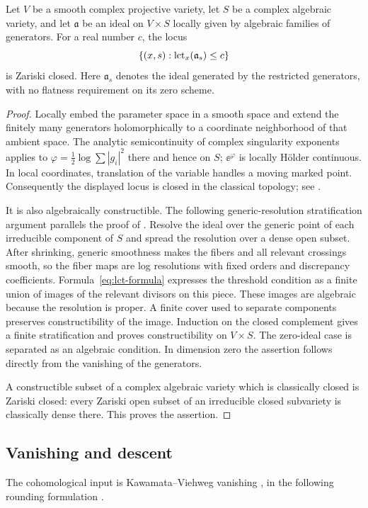 \begin{lemma}\label{lem:lct-family}
Let $V$ be a smooth complex projective variety, let $S$ be a complex algebraic variety, and let $\mathfrak{a}$ be an ideal on $V\times S$ locally given by algebraic families of generators. For a real number $c$, the locus
\[
 \{(x,s):\operatorname{lct}_x(\mathfrak{a}_s)\leq c\}
\]
is Zariski closed. Here $\mathfrak{a}_s$ denotes the ideal generated by the restricted generators, with no flatness requirement on its zero scheme.
\end{lemma}
\begin{proof}
Locally embed the parameter space in a smooth space and extend the finitely many generators holomorphically to a coordinate neighborhood of that ambient space. The analytic semicontinuity of complex singularity exponents applies to $\varphi=\tfrac12\log\sum |g_i|^2$ there and hence on $S$; $\ee^{\varphi}$ is locally H\"older continuous. In local coordinates, translation of the variable handles a moving marked point. Consequently the displayed locus is closed in the classical topology; see \cite[Lemma~3.2]{dk2001}.

It is also algebraically constructible. The following generic-resolution stratification argument parallels the proof of \cite[Theorem~3.1]{dk2001}. Resolve the ideal over the generic point of each irreducible component of $S$ and spread the resolution over a dense open subset. After shrinking, generic smoothness makes the fibers and all relevant crossings smooth, so the fiber maps are log resolutions with fixed orders and discrepancy coefficients. Formula~\eqref{eq:lct-formula} expresses the threshold condition as a finite union of images of the relevant divisors on this piece. These images are algebraic because the resolution is proper. A finite cover used to separate components preserves constructibility of the image. Induction on the closed complement gives a finite stratification and proves constructibility on $V\times S$. The zero-ideal case is separated as an algebraic condition. In dimension zero the assertion follows directly from the vanishing of the generators.

A constructible subset of a complex algebraic variety which is classically closed is Zariski closed: every Zariski open subset of an irreducible closed subvariety is classically dense there. This proves the assertion.
\end{proof}

\subsection{Vanishing and descent}
The cohomological input is Kawamata--Viehweg vanishing \cite{kawamata1982,viehweg1982}, in the following rounding formulation \cite[Theorem~0.1]{fujinoKV}.

